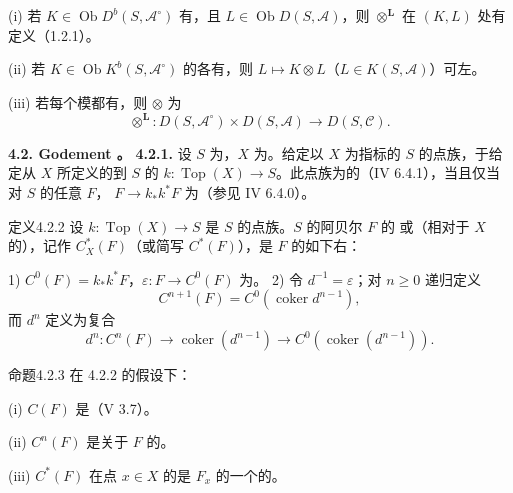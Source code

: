 (i) 若 $K\in\operatorname{Ob}D^b(S,\mathscr A^\circ)$ 有，且 $L\in\operatorname{Ob}D(S,\mathscr A)$，则 $\otimes^{\mathbf L}$ 在 $(K,L)$ 处有定义（1.2.1）。

(ii) 若 $K\in\operatorname{Ob}K^b(S,\mathscr A^\circ)$ 的各有，则 $L\mapsto K\otimes L$（$L\in K(S,\mathscr A)$）可左。

(iii) 若每个模都有，则 $\otimes$ 为
\[\mathbin{\otimes^{\mathbf L}}:D(S,\mathscr A^\circ)\times D(S,\mathscr A)\longrightarrow D(S,\mathscr C).\]

\textbf{4.2. Godement 。}
\textbf{4.2.1.} 设 $S$ 为，$X$ 为。给定以 $X$ 为指标的 $S$ 的点族，于给定从 $X$ 所定义的到 $S$ 的 $k:\operatorname{Top}(X)\to S$。此点族为的（IV 6.4.1），当且仅当对 $S$ 的任意 $F$， $F\to k_*k^*F$ 为（参见 IV 6.4.0）。
\begin{SGAresult}{定义}{4.2.2}
设 $k:\operatorname{Top}(X)\to S$ 是 $S$ 的点族。$S$ 的阿贝尔 $F$ 的 或（相对于 $X$ 的），记作 $C_X^*(F)$（或简写 $C^*(F)$），是 $F$ 的如下右：

1) $C^0(F)=k_*k^*F$，$\varepsilon:F\to C^0(F)$ 为。
2) 令 $d^{-1}=\varepsilon$；对 $n\ge0$ 递归定义
\[C^{n+1}(F)=C^0(\operatorname{coker}d^{n-1}),\]
而 $d^n$ 定义为复合
\[d^n:C^n(F)\longrightarrow\operatorname{coker}(d^{n-1})\longrightarrow C^0(\operatorname{coker}(d^{n-1})).\]
\end{SGAresult}
\begin{SGAresult}{命题}{4.2.3}
在 4.2.2 的假设下：

(i) $C(F)$ 是（V 3.7）。

(ii) $C^n(F)$ 是关于 $F$ 的。

(iii)  $C^*(F)$ 在点 $x\in X$ 的是 $F_x$ 的一个的。
\end{SGAresult}
